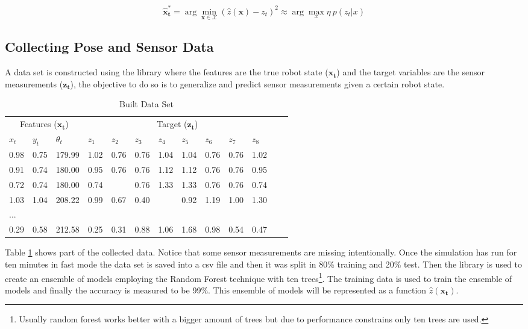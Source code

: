 \begin{equation}\label{eq:ch-3-optimization}
\mathbf{\hat x_t^*} =  \arg\min_\mathbf{x \in \mathcal{X}} (\hat z(\mathbf{x}) - z_t)^2 \approx \arg\max_x \eta \: p(z_t | x)
\end{equation}



\subsection{Collecting Pose and Sensor Data}

A data set is constructed using the  library where the features are the true robot state ($\mathbf{x_t}$) and the target variables are the sensor measurements ($\mathbf{z_t}$), the objective to do so is to generalize and predict sensor measurements given a certain robot state. 

\begin{table}[h]
\centering
    \begin{tabular}{lllllllllllll}
    \toprule
    \multicolumn{3}{c}{Features ($\mathbf{x_t}$)} & \multicolumn{8}{c}{Target ($\mathbf{z_t}$)} \\
    \cmidrule(r){1-3} \cmidrule(r){4-11}
    $x_t$ & $y_t$ & $\theta_t$ & $z_1$ & $z_2$ & $z_3$ & $z_4$ & $z_5$ & $z_6$ & $z_7$ & $z_8$ \\
    \midrule
    	    	0.98 & 0.75 & 179.99 & 1.02 & 0.76 & 0.76 & 1.04 & 1.04 & 0.76 & 0.76 & 1.02 \\
		0.91 & 0.74 & 180.00 & 0.95 & 0.76 & 0.76 & 1.12 &	1.12 & 0.76 & 0.76 & 0.95 \\
		0.72 &	0.74 &	180.00 &	0.74 &	 &	0.76 &	1.33 &	1.33 &	0.76 &	0.76 &	0.74\\
		1.03 &	1.04 &	208.22 &	0.99 &	0.67 &	0.40 &	 & 	0.92 &	1.19 &	1.00 &	1.30\\
		...\\
		0.29 &	0.58 &	212.58 &	0.25 &	0.31 &	0.88 &	1.06 &	1.68 &	0.98	&       0.54 &	0.47\\
    \bottomrule

    \end{tabular}
     \caption{Built Data Set}
     \label{tab:ch-3:built-data-set}
\end{table}

Table \ref{tab:ch-3:built-data-set} shows part of the collected data. Notice that some sensor measurements are missing intentionally. Once the simulation has run for ten minutes in fast mode the data set is saved into a csv file and then it was split in 80\% training and 20\% test. Then the  library is used to create an ensemble of models employing the Random Forest technique with ten trees\footnote{Usually random forest works better with a bigger amount of trees but due to performance constrains only ten trees are used.}. The training data is used to train the ensemble of models and finally the accuracy is measured to be 99\%. This ensemble of models will be represented as a function $\hat z(\mathbf{x_t})$.

